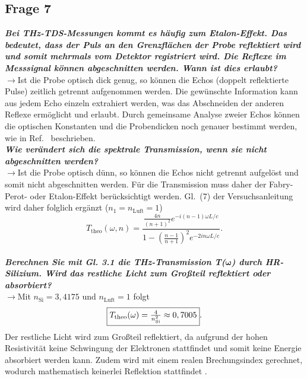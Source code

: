 \subsection{\label{subsec:FZV7}Frage 7}
\textbf{\textit{Bei THz-TDS-Messungen kommt es häufig zum Etalon-Effekt. Das bedeutet, dass
der Puls an den Grenzflächen der Probe reflektiert wird und somit mehrmals vom
Detektor registriert wird. Die Reflexe im Messsignal können abgeschnitten werden.
Wann ist dies erlaubt?}}\\
$\rightarrow$Ist die Probe optisch dick genug, so können die Echos (doppelt reflektierte Pulse) 
zeitlich getrennt aufgenommen werden. 
Die gewünschte Information kann aus jedem Echo einzeln extrahiert werden, was das Abschneiden 
der anderen Reflexe ermöglicht und erlaubt. Durch gemeinsame Analyse zweier Echos können 
die optischen Konstanten und die Probendicken noch genauer bestimmt werden, wie in 
Ref.~\cite{Q9} beschrieben.\\

\textbf{\textit{Wie verändert sich die spektrale Transmission, wenn sie
nicht abgeschnitten werden?}}\\
$\rightarrow$Ist die Probe optisch dünn, so können die Echos nicht getrennt aufgelöst und somit 
nicht abgeschnitten werden. Für die Transmission muss daher der Fabry-Perot- oder Etalon-Effekt
berücksichtigt werden. Gl.~(7) der Versuchsanleitung wird daher folglich ergänzt 
($n_{1}=n_{\text{Luft}}=1$) \cite{Q9}
\begin{equation}
    T_{\text{theo}}(\omega, n) = \frac{\frac{4n}{(n+1)^{2}}e^{-i(n-1)\omega L/c}}{1-\left(\frac{n-1}{n+1}\right)^{2}e^{-2in\omega L/c}}. 
\end{equation} \\

\textbf{\textit{Berechnen Sie mit Gl. 3.1 die THz-Transmission T($\mathbf{\omega}$) durch HR-Silizium. Wird
das restliche Licht zum Großteil reflektiert oder absorbiert?}}\\
$\rightarrow$Mit $n_{\text{Si}}=3,4175$ und $n_{\text{Luft}}=1$ folgt
\begin{equation}
    \fbox{$T_{\text{theo}}(\omega) = \frac{4}{n_{\text{Si}}^{2}} \approx 0,7005$}.
\end{equation}
Der restliche Licht wird zum Großteil reflektiert, da aufgrund der hohen Resistivität keine 
Schwingung der Elektronen stattfindet und somit keine Energie absorbiert werden kann. 
Zudem wird mit einem realen Brechungsindex gerechnet, wodurch mathematisch 
keinerlei Reflektion stattfindet \cite{EPC}. 
